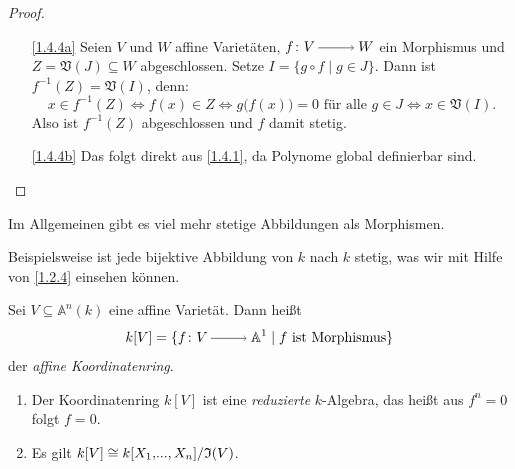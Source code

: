 \documentclass[a4paper,12pt,index=toc]{scrbook}
\theoremstyle{keinenummern} %
\def\A{\mathbb{A}}
\def\V{\mathfrak{V}}
\def\I{\mathfrak{I}}
\renewcommand{\dotsc}{\ensuremath{\!...}}
\newcommand{\polyx}[1][n]{\ensuremath%
  [X_{1},\dotsc,X_{#1}]}
\begin{document}
\begin{proof}
\begin{enumerate}
\item[\ref{1.4.4a}] Seien $V$ und $W$ affine Varietäten, $f\colon V\ra W$ ein Morphismus und $Z=\V(J)\subseteq W$ abgeschlossen. Setze $I=\{g\circ f \mid g\in J\}$. Dann ist $f^{-1}(Z)=\V(I)$, denn: 
\begin{equation*}x\in f^{-1}(Z)\iff f(x)\in Z \iff g\bigl(f(x)\bigr)=0\text{ für alle }g\in J\iff x\in\V(I).\end{equation*}
Also ist $f^{-1}(Z)$ abgeschlossen und $f$ damit stetig.
\item[\ref{1.4.4b}] Das folgt direkt aus \cref{1.4.1}, da Polynome global definierbar sind.
\end{enumerate}
\end{proof}

\begin{w}
Im Allgemeinen gibt es viel mehr stetige Abbildungen als Morphismen. 

Beispielsweise ist jede bijektive Abbildung von $k$ nach $k$   stetig, was wir mit Hilfe von \cref{1.2.4} einsehen können.

\end{w}\par

\begin{dfn}\label{1.4.5}
Sei $V\subseteq \A^n(k)$ eine affine Varietät. Dann heißt 
\begin{equation*}k[V]=\{f\colon V\ra \A^{1} \mid f\text{ ist Morphismus\}}\end{equation*}
 der \emph{affine Koordinatenring}.
\end{dfn}

\begin{bem}
\begin{enumerate}
\item{} Der Koordinatenring $k[V]$ ist eine \emph{reduzierte} $k$-Algebra, das heißt aus $f^n=0$ folgt $f=0$.
\item{} Es gilt $k[V] \cong \Quotient{k\polyx}{\I(V)}$.
\end{enumerate}
\end{bem}
\end{document}
